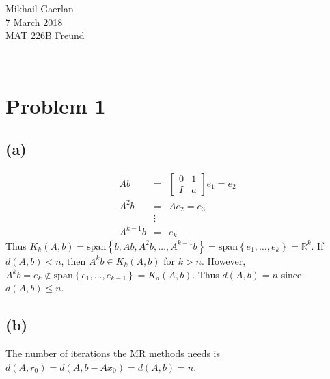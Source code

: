 \documentclass[11pt]{article}
\newcommand{\R}{\ensuremath{\mathbb{R}}}
\theoremstyle{definition}
\theoremstyle{remark}
\newcommand{\newquestion}{\hrulefill\vspace{-0.8\baselineskip}\\\null\hrulefill\vspace{-1.0\baselineskip}}
\newcommand{\newpart}{\vspace{-0.5\baselineskip}\hrulefill\vspace{-1.3\baselineskip}}
\theoremstyle{plain}
\begin{document}
  \begin{flushright}
    Mikhail Gaerlan\\
    7 March 2018\\
    MAT 226B Freund
  \end{flushright}
\vspace{-1.3\baselineskip}

\newquestion
%
%
\section*{Problem 1}

\newpart
\subsection*{(a)}

\begin{eqnarray*}
  Ab&=&\left[
  \begin{array}{cc}
    0&1\\
    I&a
  \end{array}\right]e_1=e_2\\
  A^2b&=&Ae_2=e_3\\
    &\vdots&\\
  A^{k-1}b&=&e_k
\end{eqnarray*}
Thus $K_k\left(A,b\right)=\textrm{span}\left\{b,Ab,A^2b,\ldots,A^{k-1}b\right\}=\textrm{span}\left\{e_1,\ldots,e_k\right\}=\R^k$. If $d\left(A,b\right)<n$, then $A^kb\in K_k\left(A,b\right)$ for $k>n$. However, $A^kb=e_k\notin\textrm{span}\left\{e_1,\ldots,e_{k-1}\right\}=K_d\left(A,b\right)$. Thus $d\left(A,b\right)=n$ since $d\left(A,b\right)\leq n$.

\newpart
\subsection*{(b)}
The number of iterations the MR methods needs is $d\left(A,r_0\right)=d\left(A,b-Ax_0\right)=d\left(A,b\right)=n$.

\newpart
\end{document}
